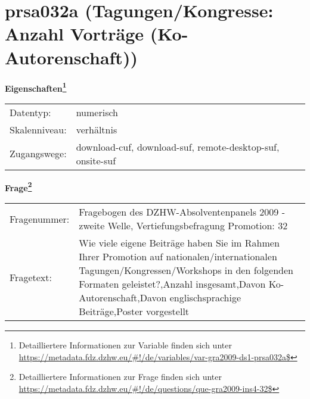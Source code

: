 
    \setcounter{footnote}{0}

    \vspace*{-1.8cm}
	\section{prsa032a (Tagungen/Kongresse: Anzahl Vorträge (Ko-Autorenschaft))}
	\label{section:prsa032a}



    \vspace*{0.5cm}
    \noindent\textbf{Eigenschaften\footnote{Detailliertere Informationen zur Variable finden sich unter
		\url{https://metadata.fdz.dzhw.eu/\#!/de/variables/var-gra2009-ds1-prsa032a$}}}\\
	\begin{tabularx}{\hsize}{@{}lX}
	Datentyp: & numerisch \\
	Skalenniveau: & verhältnis \\
	Zugangswege: &
	  download-cuf, 
	  download-suf, 
	  remote-desktop-suf, 
	  onsite-suf
 \\
    \end{tabularx}



				\vspace*{0.5cm}
                \noindent\textbf{Frage\footnote{Detailliertere Informationen zur Frage finden sich unter
		              \url{https://metadata.fdz.dzhw.eu/\#!/de/questions/que-gra2009-ins4-32$}}}\\
				\begin{tabularx}{\hsize}{@{}lX}
					Fragenummer: &
					  Fragebogen des DZHW-Absolventenpanels 2009 - zweite Welle, Vertiefungsbefragung Promotion:
					  32
 \\
					Fragetext: & Wie viele eigene Beiträge haben Sie im Rahmen Ihrer Promotion auf nationalen/internationalen Tagungen/Kongressen/Workshops in den folgenden Formaten geleistet?,Anzahl insgesamt,Davon Ko-Autorenschaft,Davon englischsprachige Beiträge,Poster vorgestellt \\
				\end{tabularx}






